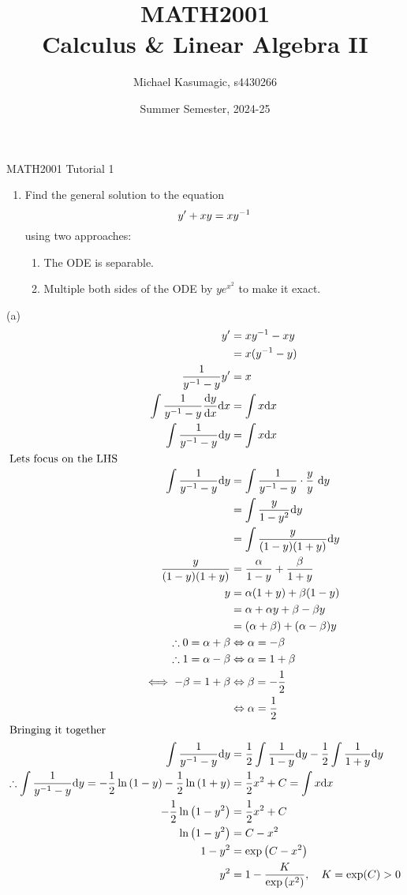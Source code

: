 \documentclass{report}
\title{\Huge{MATH2001}\\Calculus \& Linear Algebra II}
\author{\huge{Michael Kasumagic, s4430266}}
\date{\huge{Summer Semester, 2024-25}}
\begin{document}
\begin{center}
  {
    \LARGE
    MATH2001 Tutorial 1 \\
  }
\end{center}
    
\begin{enumerate}
  \item Find the general solution to the equation
  $$
    y' + xy = xy^{-1}
  $$
  using two approaches:
  \begin{enumerate}
    \item The ODE is separable.
    \item Multiple both sides of the ODE by $ye^{x^2}$ to make it exact.
  \end{enumerate}
\end{enumerate}
\sol (a)
\begin{align*}
  y' &= xy^{-1} - xy \\
    &= x(y^{-1} - y) \\
  \frac{1}{y^{-1} - y} y' &= x \\
  \int \frac{1}{y^{-1} - y}\frac{\mathrm{d} y}{\mathrm{d} x}\mathrm{d} x &= \int x\mathrm{d} x \\
  \int \frac{1}{y^{-1} - y}\mathrm{d} y &= \int x\mathrm{d} x \\
  \intertext{Lets focus on the LHS}
  \int \frac{1}{y^{-1} - y}\mathrm{d} y &= \int\frac{1}{y^{-1} - y}\cdot\frac{y}{y}\ \mathrm{d} y \\
    &= \int\frac{y}{1 - y^2} \mathrm{d} y \\
    &= \int\frac{y}{(1 - y)(1 + y)} \mathrm{d} y \\
  \frac{y}{(1 - y)(1 + y)} &= \frac{\alpha}{1-y} + \frac{\beta}{1 + y} \\
  y &= \alpha(1 + y) + \beta(1 - y) \\
    &= \alpha + \alpha y + \beta - \beta y \\
    &= (\alpha + \beta) + (\alpha - \beta) y \\
  \therefore 0 = \alpha + \beta &\Leftrightarrow \alpha = -\beta \\
  \therefore 1 = \alpha - \beta &\Leftrightarrow \alpha = 1 + \beta \\
  \iff -\beta = 1 + \beta &\Leftrightarrow \beta = -\frac{1}{2} \\
    &\Leftrightarrow \alpha = \frac{1}{2} \\
  \intertext{Bringing it together}
  \int\frac{1}{y^{-1} - y}\mathrm{d} y &= \frac{1}{2}\int\frac{1}{1-y}\mathrm{d} y - \frac{1}{2}\int\frac{1}{1 + y}\mathrm{d} y \\
  \therefore \int\frac{1}{y^{-1} - y}\mathrm{d} y = -\frac{1}{2}\ln\left( 1-y \right) - \frac{1}{2}\ln\left( 1 + y \right) &= \frac{1}{2}x^2 + C = \int x\mathrm{d} x \\
  -\frac{1}{2}\ln\left( 1-y^2 \right) &= \frac{1}{2}x^2 + C \\
  \ln\left( 1-y^2 \right) &= C - x^2 \\
  1-y^2 &= \exp\left( C - x^2 \right) \\
  y^2 &= 1 - \frac{K}{\exp\left( x^2 \right)},\quad K=\exp(C)>0 \\
\end{align*}
\end{document}
